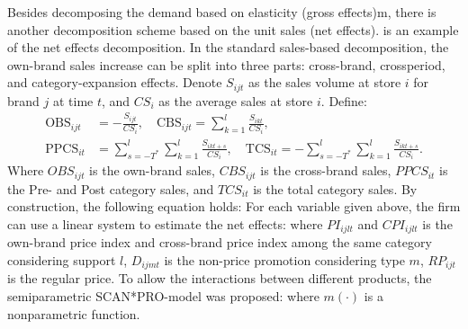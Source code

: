 \documentclass[12pt]{report}
\begin{document}
Besides decomposing the demand based on elasticity (gross effects)m, there is another decomposition scheme based on the unit sales (net effects). 
\cite{VanHeerde2004} is an example of the net effects decomposition. In the standard sales-based decomposition, the own-brand sales increase can be split into three parts: 
cross-brand, crossperiod, and category-expansion effects. Denote $S_{ijt}$ as the sales volume at store $i$ for brand $j$ at time $t$, and $CS_{i}$ as the average sales at store $i$. 
Define:
\[
    \begin{aligned}
        \mathrm{OBS}_{ijt}&=-\frac{S_{ijt}}{CS_i},\quad\mathrm{CBS}_{ijt}=\sum_{k=1}^{l}\frac{S_{ikt}}{CS_i},\\
        \mathrm{PPCS}_{it}&=\sum_{s=-T^*}^{l}\sum_{k=1}^{l}\frac{S_{ikt+s}}{CS_i},\quad\mathrm{TCS}_{it}=-\sum_{s=-T^*}^{l}\sum_{k=1}^{l}\frac{S_{ikt+s}}{CS_i}.
    \end{aligned}
\]
Where $OBS_{ijt}$ is the own-brand sales, $CBS_{ijt}$ is the cross-brand sales, $PPCS_{it}$ is the Pre- and Post category sales, and $TCS_{it}$ is the total category sales. By construction, the following equation holds:
For each variable given above, the firm can use a linear system to estimate the net effects:
where $PI_{ijlt}$ and $CPI_{ijlt}$ is the own-brand price index and cross-brand price index among the same category considering support $l$, $D_{ijmt}$ is the non-price promotion 
considering type $m$, $RP_{ijt}$ is the regular price. To allow the interactions between different products, the semiparametric SCAN*PRO-model was proposed:
where $m(\cdot)$ is a nonparametric function.
\end{document}
